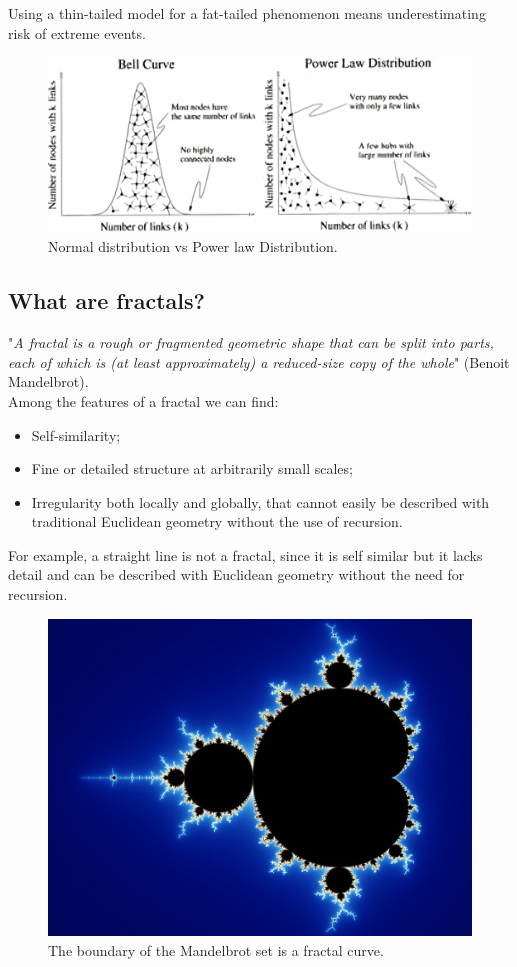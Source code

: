 Using a thin-tailed model for a fat-tailed phenomenon means underestimating risk of extreme events.
\begin{figure} [H]
    \centering
    \includegraphics[width=1\linewidth]{img/ee.png}
    \caption{Normal distribution vs Power law Distribution.}
\end{figure}

\subsection{What are fractals?}
"\textit{A fractal is a rough or fragmented geometric shape that can be split into parts, each of which is (at least approximately) a reduced-size copy of the whole}" (Benoit Mandelbrot). \\

Among the features of a fractal we can find:
\begin{itemize}
    \item Self-similarity;
    \item Fine or detailed structure at arbitrarily small scales;
    \item Irregularity both locally and globally, that cannot easily be described with traditional Euclidean geometry without the use of recursion.
\end{itemize}
For example, a straight line is not a fractal, since it is self similar but it lacks detail and can be described with Euclidean geometry without the need for recursion.
\begin{figure} [H]
    \centering
    \includegraphics[width=0.65\linewidth]{img/Mandel_zoom_00_mandelbrot_set.jpg}
    \caption{The boundary of the Mandelbrot set is a fractal curve.}
\end{figure}
